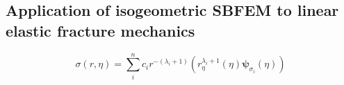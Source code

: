 \subsection{Application of isogeometric SBFEM to linear elastic fracture mechanics}

    \begin{equation}
        \sigma(r,\eta) = \sum_i^n
            c_i r^{-(\lambda_i+1)} \left(
                r_\eta^{\lambda_i+1} (\eta)
                \boldsymbol{\psi}_{\sigma_i}(\eta)
            \right)
        \label{iso_eq:isosbfem_fracture_stress_field}
    \end{equation}

\pagebreak